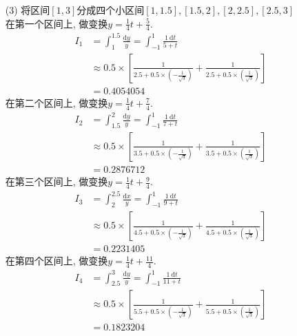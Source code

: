 \documentclass[a4paper]{article}
\begin{document}
\begin{enumerate}
\begin{equation}
    \end{equation}
    \item [(3)]
    将区间$[1, 3]$分成四个小区间$[1, 1.5], [1.5, 2], [2, 2.5], [2.5, 3]$ \\
    在第一个区间上, 做变换$y = \frac{1}{4}t + \frac{5}{4}$.
    \begin{equation}
        \begin{aligned} I_{1} & =\int_{1}^{1.5} \frac{\mathrm{d} y}{y}=\int_{-1}^{1} \frac{1 \mathrm{~d} t}{5+ t} \\ & \approx 0.5 \times\left[\frac{1}{2.5+0.5 \times\left(-\frac{1}{\sqrt{3}}\right)}+\frac{1}{2.5+0.5 \times\left(\frac{1}{\sqrt{3}}\right)}\right] \\ & =0.4054054\end{aligned}
    \end{equation}
    在第二个区间上, 做变换$y = \frac{1}{4}t + \frac{7}{4}$.
    \begin{equation}
        \begin{aligned}
            I_{2} &=\int_{1.5}^{2} \frac{\mathrm{d} y}{y}=\int_{-1}^{1} \frac{1 \mathrm{~d} t}{7+ t} \\
            & \approx 0.5 \times\left[\frac{1}{3.5+0.5 \times\left(-\frac{1}{\sqrt{3}}\right)}+\frac{1}{3.5+0.5 \times\left(\frac{1}{\sqrt{3}}\right)}\right] \\
            & =0.2876712
        \end{aligned}
    \end{equation}
    在第三个区间上, 做变换$y = \frac{1}{4}t + \frac{9}{4}$.
    \begin{equation}
        \begin{aligned} I_{3} & =\int_{2}^{2.5} \frac{\mathrm{d} x}{y}=\int_{-1}^{1} \frac{1 \mathrm{~d} t}{9+ t} \\ & \approx 0.5 \times\left[\frac{1}{4.5+0.5 \times\left(-\frac{1}{\sqrt{3}}\right)}+\frac{1}{4.5+0.5 \times\left(\frac{1}{\sqrt{3}}\right)}\right] \\ & =0.2231405\end{aligned}
    \end{equation}
    在第四个区间上, 做变换$y = \frac{1}{4}t + \frac{11}{4}$.
    \begin{equation}
        \begin{aligned} I_{4} & =\int_{2.5}^{3} \frac{\mathrm{d} y}{y}=\int_{-1}^{1} \frac{1 \mathrm{~d} t}{11+ t} \\ & \approx 0.5 \times\left[\frac{1}{5.5+0.5 \times\left(-\frac{1}{\sqrt{3}}\right)}+\frac{1}{5.5+0.5 \times\left(\frac{1}{\sqrt{3}}\right)}\right]\\ &=0.1823204\end{aligned}

\end{equation}
\end{enumerate}
\end{document}
